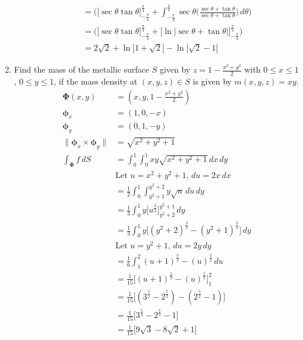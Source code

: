 \documentclass{article}
\newcommand{\norm}[1]{\| #1 \|}
\begin{document}
\begin{enumerate}
\begin{enumerate}
\begin{align*}
             &= \Big( \Big[ \sec \theta \tan \theta \Big]_{-\frac{\pi}{4}}^{\frac{\pi}{4}} + \int_{-\frac{\pi}{4}}^{\frac{\pi}{4}} \sec \theta \Big( \frac{\sec \theta + \tan \theta}{\sec \theta + \tan \theta}\Big)\, d \theta \Big) \\
             &= \Big( \Big[ \sec \theta \tan \theta \Big]_{-\frac{\pi}{4}}^{\frac{\pi}{4}} + \Big[\ln|\sec \theta + \tan \theta |\Big]_{-\frac{\pi}{4}}^{\frac{\pi}{4}} \Big) \\
             &= 2\sqrt2 + \ln |1 + \sqrt2| - \ln |\sqrt2 -1|
        \end{align*} 
    \end{enumerate}
    \newpage
    \item Find the mass of the metallic surface $S$ given by $\displaystyle z = 1 - \frac{x^2 + y^2}{2}$ with $0 \leq x \leq 1$, $0 \leq y \leq 1$, if the mass density at $(x,y,z) \in S$ is given by $m(x,y,z) = xy$.
    \begin{align*}
        \boldsymbol \Phi(x,y) &= (x,y,1 - \frac{x^2 + y^2}{2})\\
        \boldsymbol \phi_x &= (1,0,- x)\\
        \boldsymbol \phi_y &= (0,1,- y)\\
        \norm{\boldsymbol \phi_x \times \boldsymbol \phi_y }&= \sqrt{x^2 + y^2 + 1} \\
        \int_{\boldsymbol \Phi} f\, dS &= \int_0^1 \int_0^1 xy \sqrt{x^2 + y^2 + 1} \, dx \, dy \\
        &\text{Let }u = x^2 + y^2 + 1 ,\, du = 2x \, dx\\
        &= \frac{1}{2}\int_0^1 \int_{y^2+1}^{y^2 + 2} y \sqrt{u} \, du \, dy \\
        &= \frac{1}{3}\int_0^1 y\Big[u^{\frac{3}{2}}\Big]_{y^2+2}^{y^2 + 1} \, dy \\
        &= \frac{1}{3}\int_0^1 y\Big[(y^2+2)^{\frac{3}{2}} - (y^2+1)^{\frac{3}{2}}\Big]\, dy \\
        &\text{Let }u = y^2 + 1 ,\, du = 2y \, dy \\
        &= \frac{1}{6}\int_1^2 (u+1)^{\frac{3}{2}} - (u)^{\frac{3}{2}}\, du \\
        &= \frac{1}{15} \Big[(u+1)^{\frac{5}{2}} - (u)^{\frac{5}{2}}\Big]_1^2 \\
        &= \frac{1}{15} \Big[(3^{\frac{5}{2}} - 2^{\frac{5}{2}}) - (2^{\frac{5}{2}} - 1)\Big]\\
        &= \frac{1}{15} \Big[3^{\frac{5}{2}} - 2^{\frac{7}{2}} - 1\Big]\\
        &= \frac{1}{15} \Big[9\sqrt{3} - 8 \sqrt{2} + 1\Big]\\
    \end{align*} 
\end{enumerate}
\newpage
\end{document}
